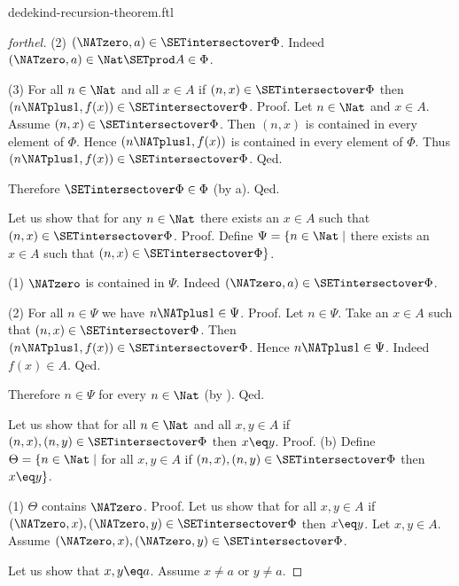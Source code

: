 \documentclass{naproche-library}
\begin{document}
\begin{smodule}[title=Dedekind's Recursion Theorem]{dedekind-recursion-theorem.ftl}
\begin{proof}[forthel]
    (2) $(\NATzero, a) \in \SETintersectover \Phi$. \newline
    Indeed $(\NATzero, a) \in \Nat \SETprod A \in \Phi$.

    (3) For all $n \in \Nat$ and all $x \in A$ if $(n, x) \in
    \SETintersectover \Phi$ then $(n \NATplus 1, f(x)) \in \SETintersectover \Phi$. \newline
    Proof.
      Let $n \in \Nat$ and $x \in A$.
      Assume $(n, x) \in \SETintersectover \Phi$.
      Then $(n, x)$ is contained in every element of $\Phi$.
      Hence $(n \NATplus 1, f(x))$ is contained in every element of $\Phi$.
      Thus $(n \NATplus 1, f(x)) \in \SETintersectover \Phi$.
    Qed.

    Therefore $\SETintersectover \Phi \in \Phi$ (by a).
  Qed.

  Let us show that for any $n \in \Nat$ there exists an $x \in A$ such
  that $(n, x) \in \SETintersectover \Phi$. \newline
  Proof.
    Define $\Psi = \{ n \in \Nat \mid$ there exists an $x \in A$ such that
    $(n, x) \in \SETintersectover \Phi \}$.

    (1) $\NATzero$ is contained in $\Psi$.
    Indeed $(\NATzero, a) \in \SETintersectover \Phi$.

    (2) For all $n \in \Psi$ we have $n \NATplus 1 \in \Psi$. \newline
    Proof.
      Let $n \in \Psi$.
      Take an $x \in A$ such that $(n, x) \in \SETintersectover \Phi$.
      Then $(n \NATplus 1, f(x)) \in \SETintersectover \Phi$.
      Hence $n \NATplus 1 \in \Psi$.
      Indeed $f(x) \in A$.
    Qed.

    Therefore $n \in \Psi$ for every $n \in \Nat$ (by ).
  Qed.

  Let us show that for all $n \in \Nat$ and all $x, y \in A$ if
  $(n, x), (n, y) \in \SETintersectover \Phi$ then $x \eq y$. \newline
  Proof.
    (b) Define $\Theta = \{ n \in \Nat \mid$ for all $x, y \in A$ if
    $(n, x), (n, y) \in \SETintersectover \Phi$ then $x \eq y \}$.

    (1) $\Theta$ contains $\NATzero$. \newline
    Proof.
      Let us show that for all $x, y \in A$ if $(\NATzero, x), (\NATzero, y) \in
      \SETintersectover \Phi$ then $x \eq y$.
        Let $x, y \in A$.
        Assume $(\NATzero, x), (\NATzero, y) \in \SETintersectover \Phi$.

        Let us show that $x, y \eq a$.
          Assume $x \neq a$ or $y \neq a$.


\end{proof}
\end{smodule}
\end{document}
